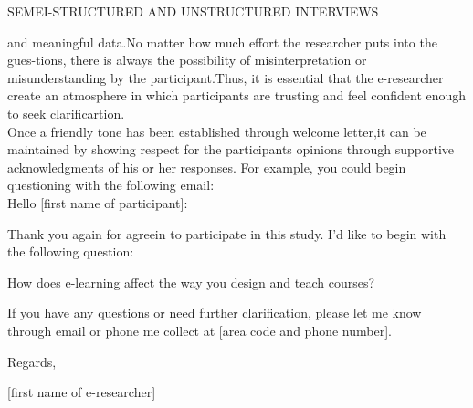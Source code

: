 \documentclass[10pt]{book}
\begin{document}
\begin{flushright}
SEMEI-STRUCTURED AND UNSTRUCTURED INTERVIEWS
\end{flushright}
and meaningful data.No matter how much effort the researcher puts into the gues-tions, there is always the possibility of misinterpretation or misunderstanding by the participant.Thus, it is essential that the e-researcher create an atmosphere in which participants are trusting and feel confident enough to seek clarificartion.\\
Once a friendly tone has been established through welcome letter,it can be maintained by  showing respect for the participants opinions through supportive acknowledgments of his or her responses. For example, you could begin questioning with the following email:\\

\vspace{3mm}
Hello [first name of participant]:

\vspace{3mm}
Thank you again for agreein to participate in this study. I'd like to begin with the following question:

\vspace{3mm}
How does e-learning affect the way you design and teach courses?

\vspace{3mm}
If you have any questions or need further clarification, please let me know through email or phone me collect at [area code and phone number].

\vspace{4mm}
Regards,

\vspace{3mm}
[first name of e-researcher]
\end{document}
